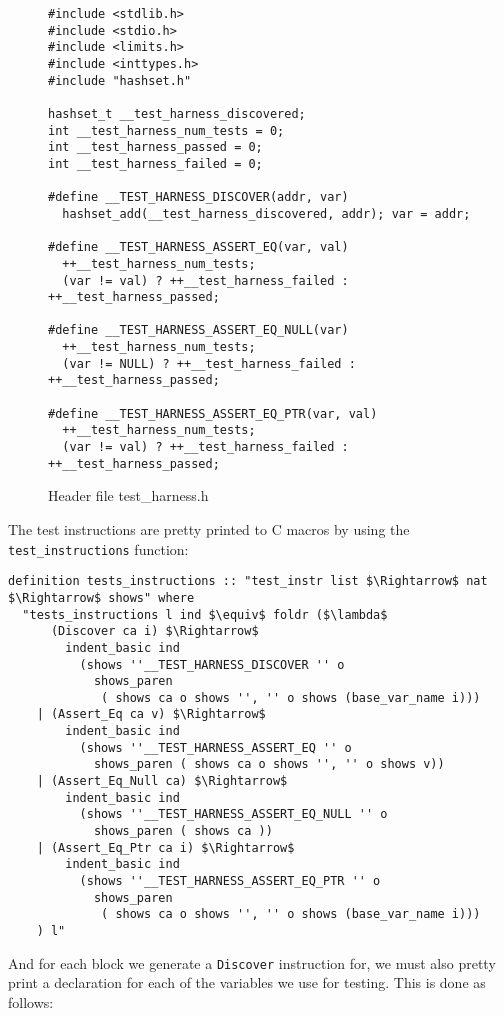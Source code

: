 \begin{figure}
\begin{lstlisting}[mathescape=true]
#include <stdlib.h>
#include <stdio.h>
#include <limits.h>
#include <inttypes.h>
#include "hashset.h"

hashset_t __test_harness_discovered;
int __test_harness_num_tests = 0;
int __test_harness_passed = 0;
int __test_harness_failed = 0;

#define __TEST_HARNESS_DISCOVER(addr, var)
  hashset_add(__test_harness_discovered, addr); var = addr;

#define __TEST_HARNESS_ASSERT_EQ(var, val)
  ++__test_harness_num_tests;
  (var != val) ? ++__test_harness_failed : ++__test_harness_passed;

#define __TEST_HARNESS_ASSERT_EQ_NULL(var)
  ++__test_harness_num_tests;
  (var != NULL) ? ++__test_harness_failed : ++__test_harness_passed;

#define __TEST_HARNESS_ASSERT_EQ_PTR(var, val)
  ++__test_harness_num_tests;
  (var != val) ? ++__test_harness_failed : ++__test_harness_passed;
\end{lstlisting}

\caption{Header file test\_harness.h}
\label{fig:header_test_harness}
\end{figure}


The test instructions are pretty printed to C macros by using the \verb|test_instructions| function:

\begin{lstlisting}[mathescape=true, frame=single]
definition tests_instructions :: "test_instr list $\Rightarrow$ nat $\Rightarrow$ shows" where
  "tests_instructions l ind $\equiv$ foldr ($\lambda$
      (Discover ca i) $\Rightarrow$
        indent_basic ind
          (shows ''__TEST_HARNESS_DISCOVER '' o
            shows_paren
             ( shows ca o shows '', '' o shows (base_var_name i)))
    | (Assert_Eq ca v) $\Rightarrow$
        indent_basic ind
          (shows ''__TEST_HARNESS_ASSERT_EQ '' o
            shows_paren ( shows ca o shows '', '' o shows v))
    | (Assert_Eq_Null ca) $\Rightarrow$
        indent_basic ind
          (shows ''__TEST_HARNESS_ASSERT_EQ_NULL '' o
            shows_paren ( shows ca ))
    | (Assert_Eq_Ptr ca i) $\Rightarrow$
        indent_basic ind
          (shows ''__TEST_HARNESS_ASSERT_EQ_PTR '' o
            shows_paren
             ( shows ca o shows '', '' o shows (base_var_name i)))
    ) l"
\end{lstlisting}


And for each block we generate a \verb|Discover| instruction for, we must also pretty print a declaration for each of the variables we use for testing.
This is done as follows:

